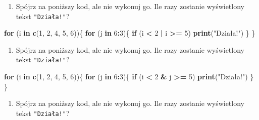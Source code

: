 \documentclass[paper=6in:9in,pagesize=pdftex,headinclude=on,footinclude=on,10pt]{scrbook}
\newenvironment{Shaded}{\begin{snugshade}}{\end{snugshade}}
\newcommand{\ControlFlowTok}[1]{\textcolor[rgb]{0.13,0.29,0.53}{\textbf{#1}}}
\newcommand{\DecValTok}[1]{\textcolor[rgb]{0.00,0.00,0.81}{#1}}
\newcommand{\KeywordTok}[1]{\textcolor[rgb]{0.13,0.29,0.53}{\textbf{#1}}}
\newcommand{\NormalTok}[1]{#1}
\newcommand{\OperatorTok}[1]{\textcolor[rgb]{0.81,0.36,0.00}{\textbf{#1}}}
\newcommand{\StringTok}[1]{\textcolor[rgb]{0.31,0.60,0.02}{#1}}
\providecommand{\tightlist}{%
  \setlength{\itemsep}{0pt}\setlength{\parskip}{0pt}}
\begin{document}
\begin{enumerate}
\def\labelenumi{\arabic{enumi})}
\setcounter{enumi}{1}
\tightlist
\item
  Spójrz na poniższy kod, ale nie wykonuj go.
  Ile razy zostanie wyświetlony tekst \texttt{"Działa!"}?
\end{enumerate}

\begin{Shaded}
\begin{Highlighting}[]
\ControlFlowTok{for}\NormalTok{ (i }\ControlFlowTok{in} \KeywordTok{c}\NormalTok{(}\DecValTok{1}\NormalTok{, }\DecValTok{2}\NormalTok{, }\DecValTok{4}\NormalTok{, }\DecValTok{5}\NormalTok{, }\DecValTok{6}\NormalTok{))\{}
  \ControlFlowTok{for}\NormalTok{ (j }\ControlFlowTok{in} \DecValTok{6}\OperatorTok{:}\DecValTok{3}\NormalTok{)\{}
    \ControlFlowTok{if}\NormalTok{ (i }\OperatorTok{<}\StringTok{ }\DecValTok{2} \OperatorTok{|}\StringTok{ }\NormalTok{i }\OperatorTok{>=}\StringTok{ }\DecValTok{5}\NormalTok{)}
      \KeywordTok{print}\NormalTok{(}\StringTok{"Działa!"}\NormalTok{)}
\NormalTok{  \}}
\NormalTok{\}}
\end{Highlighting}
\end{Shaded}

\begin{enumerate}
\def\labelenumi{\arabic{enumi})}
\setcounter{enumi}{2}
\tightlist
\item
  Spójrz na poniższy kod, ale nie wykonuj go.
  Ile razy zostanie wyświetlony tekst \texttt{"Działa!"}?
\end{enumerate}

\begin{Shaded}
\begin{Highlighting}[]
\ControlFlowTok{for}\NormalTok{ (i }\ControlFlowTok{in} \KeywordTok{c}\NormalTok{(}\DecValTok{1}\NormalTok{, }\DecValTok{2}\NormalTok{, }\DecValTok{4}\NormalTok{, }\DecValTok{5}\NormalTok{, }\DecValTok{6}\NormalTok{))\{}
  \ControlFlowTok{for}\NormalTok{ (j }\ControlFlowTok{in} \DecValTok{6}\OperatorTok{:}\DecValTok{3}\NormalTok{)\{}
    \ControlFlowTok{if}\NormalTok{ (i }\OperatorTok{<}\StringTok{ }\DecValTok{2} \OperatorTok{&}\StringTok{ }\NormalTok{j }\OperatorTok{>=}\StringTok{ }\DecValTok{5}\NormalTok{)}
      \KeywordTok{print}\NormalTok{(}\StringTok{"Działa!"}\NormalTok{)}
\NormalTok{  \}}
\NormalTok{\}}
\end{Highlighting}
\end{Shaded}

\begin{enumerate}
\def\labelenumi{\arabic{enumi})}
\setcounter{enumi}{3}
\tightlist
\item
  Spójrz na poniższy kod, ale nie wykonuj go.
  Ile razy zostanie wyświetlony tekst \texttt{"Działa!"}?
\end{enumerate}
\end{document}
